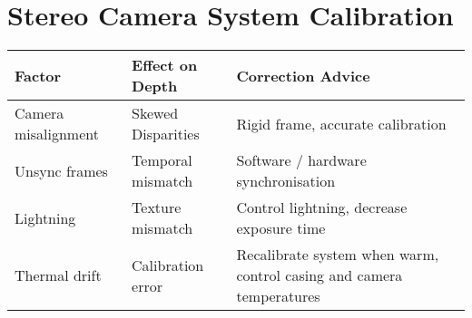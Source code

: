 \section{Stereo Camera System Calibration}

\begin{tabular}{|l|l|l|}
\hline
\textbf{Factor} & \textbf{Effect on Depth} & \textbf{Correction Advice} \\
\hline
Camera misalignment & Skewed Disparities & Rigid frame, accurate calibration \\
\hline
Unsync frames       & Temporal mismatch   & Software / hardware synchronisation \\
\hline
Lightning           & Texture mismatch    & Control lightning, decrease exposure time \\
\hline
Thermal drift       & Calibration error   & Recalibrate system when warm, control casing and camera temperatures \\
\hline
\end{tabular}
